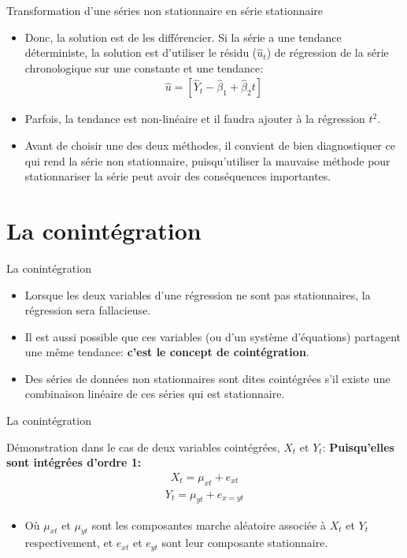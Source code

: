 \documentclass{beamer}
\begin{document}
\begin{frame}{Transformation d'une séries non stationnaire en série stationnaire}
\begin{itemize}
\item Donc, la solution est de les différencier. Si la série a une tendance déterministe, la solution est d’utiliser le résidu ($\hat{u}_t$) de régression de la série chronologique sur une constante et une tendance:
\begin{align*}
\hat{u}=[\hat{Y}_t-\hat{\beta}_1+\hat{\beta}_2 t]
\end{align*}
\item Parfois, la tendance est non-linéaire et il faudra ajouter à la régression $t^2$. 
\item Avant de choisir une des deux méthodes, il convient de bien diagnostiquer ce qui rend la série non stationnaire, puisqu’utiliser la mauvaise méthode pour stationnariser la série peut avoir des conséquences importantes. 
\end{itemize}
\end{frame}


\section{La conintégration}
\frame{\tableofcontents[current]}

\begin{frame}{La conintégration}
\begin{itemize}
\item Lorsque les deux variables d’une régression ne sont pas stationnaires, la régression sera fallacieuse. 
\item Il est aussi possible que ces variables (ou d’un système d’équations) partagent une même tendance: \textbf{c’est le concept de cointégration}.
\item Des séries de données non stationnaires sont dites cointégrées s’il existe une combinaison linéaire de ces séries qui est stationnaire. 
\end{itemize}
\end{frame}

\begin{frame}{La conintégration}
\begin{block}{Démonstration dans le cas de deux variables cointégrées, $X_t$ et $Y_t$:}
\textbf{Puisqu’elles sont intégrées d’ordre 1:}
\begin{align*}
X_t=\mu_{xt}+e_{xt}
\end{align*}
\begin{align*}
Y_t=\mu_{yt}+e_{x=yt}
\end{align*}
\begin{itemize}
\item Où $\mu_{xt}$ et $\mu_{yt}$ sont les composantes marche aléatoire associée à $X_t$ et $Y_t$ respectivement, et $e_{xt}$ et $e_{yt}$ sont leur composante stationnaire.
\end{itemize}
\end{block}
\end{frame}
\end{document}
